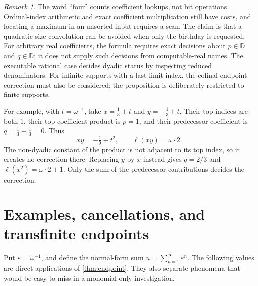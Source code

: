 \documentclass[11pt,letterpaper]{article}
\theoremstyle{definition}
\theoremstyle{remark}
\newtheorem{remark}[theorem]{Remark}
\newcommand{\D}{\mathbb{D}}
\newcommand{\bd}{\ell}
\newcommand{\ep}{\varepsilon}
\begin{document}
\begin{remark}
The word ``four'' counts coefficient lookups, not bit operations.
Ordinal-index arithmetic and exact coefficient multiplication still have
costs, and locating a maximum in an unsorted input requires a scan.
The claim is that a quadratic-size convolution can be avoided when only
the birthday is requested. For arbitrary real coefficients, the formula
requires exact decisions about \(p\in\D\) and \(q\in\D\); it does not
supply such decisions from computable-real names. The executable rational
case decides dyadic status by inspecting reduced denominators. For infinite
supports with a last limit index,
the cofinal endpoint correction must also be considered; the proposition
is deliberately restricted to finite supports.
\end{remark}

For example, with \(t=\omega^{-1}\), take
\(x=\tfrac13+t\) and \(y=-\tfrac13+t\). Their top indices are both
\(1\), their top coefficient product is \(p=1\), and their predecessor
coefficient is \(q=\tfrac13-\tfrac13=0\). Thus
\[
 xy=-\tfrac19+t^2,\qquad \bd(xy)=\omega\cdot2.
\]
The non-dyadic constant of the product is not adjacent to its top index,
so it creates no correction there. Replacing \(y\) by \(x\) instead
gives \(q=2/3\) and \(\bd(x^2)=\omega\cdot2+1\). Only the sum of
the predecessor contributions decides the correction.

\section{Examples, cancellations, and transfinite endpoints}

Put \(\ep=\omega^{-1}\), and define the normal-form sum
\(u=\sum_{n=1}^{\infty}\ep^n\). The following values are direct
applications of \cref{thm:endpoint}. They also separate phenomena that
would be easy to miss in a monomial-only investigation.
\end{document}
